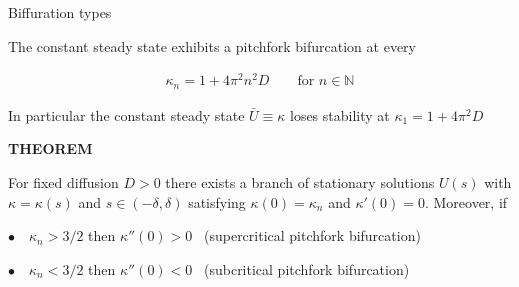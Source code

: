 \begin{frame}{Biffuration types}

  \vspace{-0.16cm}

  {\color{HydraWhite}\fontsize{8.6}{10.9}\selectfont
    The constant steady state exhibits a pitchfork bifurcation at every
  \par}

  \vspace{-0.24cm}

  {\color{HydraWhite}\fontsize{9.6}{12.2}\selectfont
  \begin{align*}
    \kappa_n=1+4\pi^2n^2D
    \qquad
    \text{for }n\in\mathbb{N}
  \end{align*}
  }

  \vspace{0.26cm}

  {\color{HydraWhite}\fontsize{8.6}{10.9}\selectfont
    In particular the constant steady state $\bar U\equiv\kappa$ loses stability at
    $\kappa_1=1+4\pi^2D$
  \par}

  \vspace{0.90cm}

  {\color{HydraGold}\bfseries\fontsize{8.2}{9.8}\selectfont
    THEOREM\par}

  \vspace{0.08cm}

  {\color{HydraWhite}\fontsize{8.6}{11}\selectfont
    For fixed diffusion $D>0$ there exists a branch of stationary solutions $U(s)$ with
    $\kappa=\kappa(s)$ and $s\in(-\delta,\delta)$ satisfying $\kappa(0)=\kappa_n$ and
    $\kappa'(0)=0$. Moreover, if
  \par}

  \vspace{0.18cm}

  {\color{HydraWhite}\fontsize{8.6}{11}\selectfont
    \hspace{0.70cm}$\bullet$\ \ $\kappa_n>3/2$ then $\kappa''(0)>0$
    \ (supercritical pitchfork bifurcation)
    \par
    \vspace{0.10cm}
    \hspace{0.70cm}$\bullet$\ \ $\kappa_n<3/2$ then $\kappa''(0)<0$
    \ (subcritical pitchfork bifurcation)
  \par}

\end{frame}


